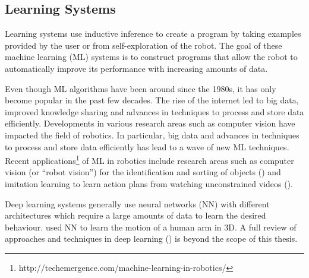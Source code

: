 \subsection{Learning Systems}\label{sssec:Learning Systems}
Learning systems use inductive inference to create a program by taking examples provided by the user or from self-exploration of the robot. 
The goal of these machine learning (ML) systems is to construct programs that allow the robot to automatically improve its performance with increasing amounts of data. 

Even though ML algorithms have been around since the 1980s, it has only become popular in the past few decades. 
The rise of the internet led to big data, improved knowledge sharing and advances in techniques to process and store data efficiently.
Developments in various research areas such as computer vision have impacted the field of robotics.
In particular, big data and advances in techniques to process and store data efficiently has lead to a wave of new ML techniques. 
Recent applications\footnote{http://techemergence.com/machine-learning-in-robotics/} of ML in robotics include research areas such as computer vision (or ``robot vision'') for the identification and sorting of objects (\cite{stager2013computer}) and imitation learning to learn action plans from watching unconstrained videos (\cite{Yang2015}).

Deep learning systems generally use neural networks (NN) with different architectures which require a large amounts of data to learn the desired behaviour.
\cite{billard2001robust} used NN to learn the motion of a human arm in 3D.
A full review of approaches and techniques in deep learning (\cite{schmidhuber2015deep}) is beyond the scope of this thesis.


